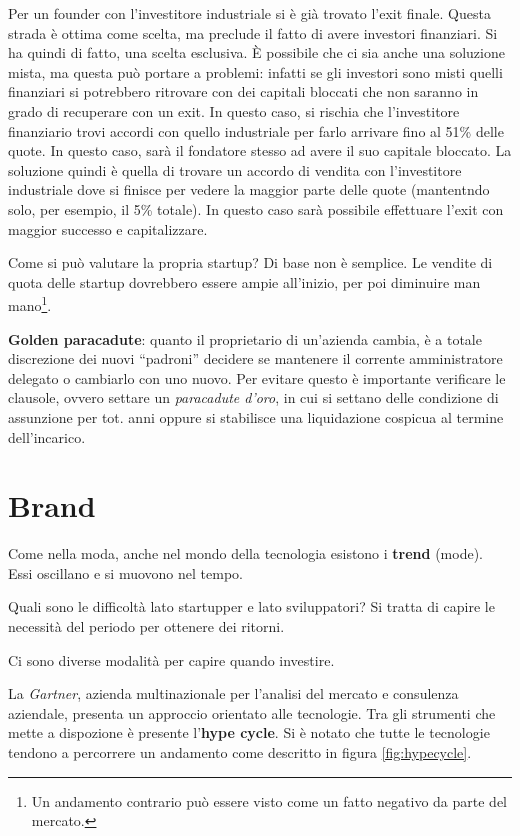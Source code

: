 Per un founder con l'investitore industriale si è già trovato l'exit finale.
Questa strada è ottima come scelta, ma preclude il fatto di avere investori
finanziari. Si ha quindi di fatto, una scelta esclusiva.
È possibile che ci sia anche una soluzione mista, ma questa può portare a
problemi: infatti se gli investori sono misti quelli finanziari si potrebbero
ritrovare con dei capitali bloccati che non saranno in grado di recuperare con
un exit. In questo caso, si rischia che l'investitore finanziario trovi accordi
con quello industriale per farlo arrivare fino al 51\% delle quote. In questo
caso, sarà il fondatore stesso ad avere il suo capitale bloccato. La soluzione
quindi è quella di trovare un accordo di vendita con l'investitore industriale
dove si finisce per vedere la maggior parte delle quote (mantentndo solo, per
esempio, il 5\% totale). In questo caso sarà possibile effettuare l'exit con
maggior successo e capitalizzare.

Come si può valutare la propria startup? Di base non è semplice. Le vendite di
quota delle startup dovrebbero essere ampie all'inizio, per poi diminuire man
mano\footnote{Un andamento contrario può essere visto come un fatto negativo da
parte del mercato.}.

\textbf{Golden paracadute}: quanto il proprietario di un'azienda cambia, è a
totale discrezione dei nuovi ``padroni'' decidere se mantenere il corrente
amministratore delegato o cambiarlo con uno nuovo. Per evitare questo è
importante verificare le clausole, ovvero settare un \textit{paracadute d'oro},
in cui si settano delle condizione di assunzione per tot. anni oppure si
stabilisce una liquidazione cospicua al termine dell'incarico.

\chapter{Brand}

Come nella moda, anche nel mondo della tecnologia esistono i \textbf{trend}
(mode). Essi oscillano e si muovono nel tempo.

Quali sono le difficoltà lato startupper e lato sviluppatori? Si tratta di
capire le necessità del periodo per ottenere dei ritorni.

Ci sono diverse modalità per capire quando investire.

La \textit{Gartner}, azienda multinazionale per l'analisi del mercato e
consulenza aziendale, presenta un approccio orientato alle tecnologie. Tra gli
strumenti che mette a dispozione è presente l'\textbf{hype cycle}.
Si è notato che tutte le tecnologie tendono a percorrere un andamento come
descritto in figura \ref{fig:hypecycle}.

